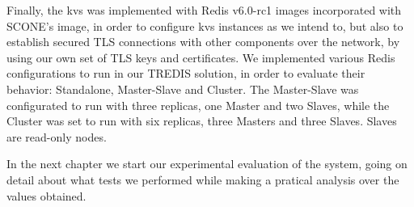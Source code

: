 Finally, the \gls{kvs} was implemented with Redis v6.0-rc1 images incorporated with SCONE's image, in order to configure \gls{kvs} instances as we intend to, but also to establish secured TLS connections with other components over the network, by using our own set of TLS keys and certificates. We implemented various Redis configurations to run in our TREDIS solution, in order to evaluate their behavior: Standalone, Master-Slave and Cluster. The Master-Slave was configurated to run with three replicas, one Master and two Slaves, while the Cluster was set to run with six replicas, three Masters and three Slaves. Slaves are read-only nodes.

In the next chapter we start our experimental evaluation of the system, going on detail about what tests we performed while making a pratical analysis over the values obtained.





